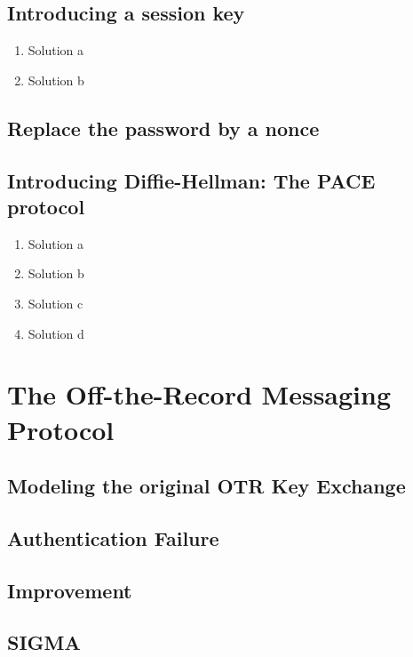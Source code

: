 \documentclass[a4paper,11pt]{scrartcl}
\begin{document}
\subsection{Introducing a session key}
\begin{enumerate}[label=\alph*)]
	\item Solution a
	\item Solution b
\end{enumerate}
\subsection{Replace the password by a nonce}
\subsection{Introducing Diffie-Hellman: The PACE protocol}
\begin{enumerate}[label=\alph*)]
	\item Solution a
	\item Solution b
	\item Solution c
	\item Solution d
\end{enumerate}
\section{The Off-the-Record Messaging Protocol}
\subsection{Modeling the original OTR Key Exchange}
\subsection{Authentication Failure}
\subsection{Improvement}
\subsection{SIGMA}
\end{document}
